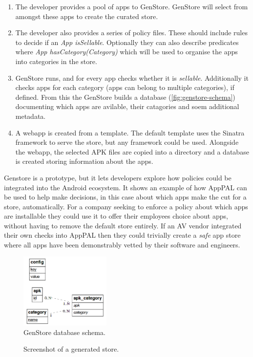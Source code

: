 \documentclass[thesis.tex]{subfiles}
\begin{document}
\begin{enumerate}
\item The developer provides a pool of apps to GenStore. GenStore will select from amongst these apps to create the curated store.
\item The developer also provides a series of policy files. These should include rules to decide if an \emph{App isSellable}.  Optionally they can also describe predicates where \emph{App hasCategory(Category)} which will be used to organise the apps into categories in the store.
\item GenStore runs, and for every app checks whether it is \emph{sellable}.  Additionally it checks apps for each category (apps can belong to multiple categories), if defined.
  From this the GenStore builds a database (\autoref{fig:genstore-schema}) documenting which apps are avilable, their catagories and soem additional metadata.
\item A webapp is created from a template.  The default template uses the Sinatra framework to serve the store, but any framework could be used.  Alongside the webapp, the selected APK files are copied into a directory and a database is created storing information about the apps.
\end{enumerate}

Genstore is a prototype, but it lets developers explore how policies could be integrated into the Android ecosystem.
It shows an example of how AppPAL can be used to help make decisions, in this case about which apps make the cut for a store, automatically.
For a company seeking to enforce a policy about which apps are installable they could use it to offer their employees choice about apps, without having to remove the default store entirely.
If an AV vendor integrated their own checks into AppPAL then they could trivially create a \emph{safe} app store where all apps have been demonstrably vetted by their software and engineers.

\begin{figure}\centering
  \includegraphics[width=0.4\textwidth]{figures/genstore-schema.png}
  \caption{GenStore database schema.}
  \label{fig:genstore-schema}
\end{figure}

\begin{figure}\centering
  \caption{Screenshot of a generated store.}
  \label{fig:genstore-screenshot}
\end{figure}
\end{document}

